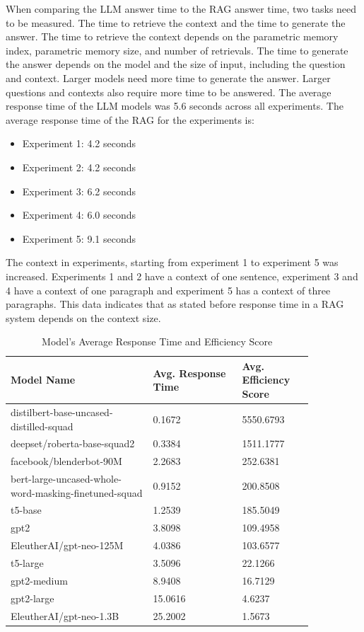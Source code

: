 \documentclass{wseas}
\begin{document}
When comparing the LLM answer time to the RAG answer time, two tasks need to be measured. The time to retrieve the context
and the time to generate the answer. The time to retrieve the context depends on the parametric memory index,
parametric memory size, and number of retrievals. The time to generate the answer depends on the model and the size of input,
including the question and context. Larger models need more time to generate the answer. Larger questions and contexts
also require more time to be answered. The average response time of the LLM models was 5.6 seconds across all experiments.
The average response time of the RAG for the experiments is:
\begin{itemize}
  \item Experiment 1: 4.2 seconds
  \item Experiment 2: 4.2 seconds
  \item Experiment 3: 6.2 seconds
  \item Experiment 4: 6.0 seconds
  \item Experiment 5: 9.1 seconds
\end{itemize}

The context in experiments, starting from experiment 1 to experiment 5 was increased. 
Experiments 1 and 2 have a context of one sentence, experiment 3 and 4 have a context
of one paragraph and experiment 5 has a context of three paragraphs.
This data indicates that as stated before response time in a RAG system depends on the context size.

\begin{table}[htbp]
  \centering
  \caption{Model's Average Response Time and Efficiency Score} %
  \label{tab:model_efficiency_scores}  %
  \begin{tabular}{|p{0.4\linewidth}|p{0.25\linewidth}|p{0.2\linewidth}|}
    \hline
    \textbf{Model Name} & \textbf{Avg. Response Time} & \textbf{Avg. Efficiency Score} \\
    \hline
    distilbert-base-uncased-distilled-squad & 0.1672 & 5550.6793 \\
    \hline
    deepset/roberta-base-squad2 & 0.3384 & 1511.1777 \\
    \hline
    facebook/blenderbot-90M & 2.2683 & 252.6381 \\
    \hline
    bert-large-uncased-whole-word-masking-finetuned-squad & 0.9152 & 200.8508 \\
    \hline
    t5-base & 1.2539 & 185.5049 \\
    \hline
    gpt2 & 3.8098 & 109.4958 \\
    \hline
    EleutherAI/gpt-neo-125M & 4.0386 & 103.6577 \\
    \hline
    t5-large & 3.5096 & 22.1266 \\
    \hline
    gpt2-medium & 8.9408 & 16.7129 \\
    \hline
    gpt2-large & 15.0616 & 4.6237 \\
    \hline
    EleutherAI/gpt-neo-1.3B & 25.2002 & 1.5673 \\
    \hline
  \end{tabular}
\end{table}
\end{document}
